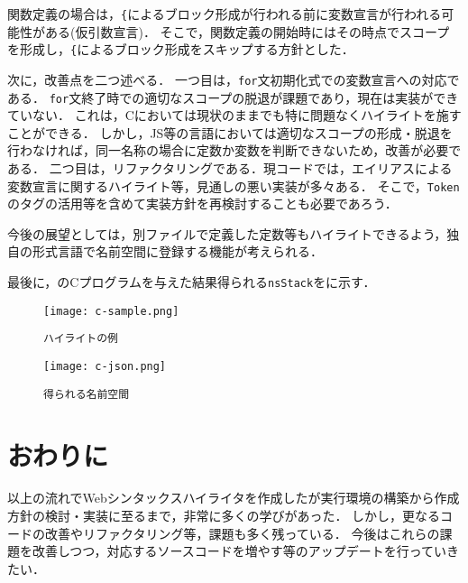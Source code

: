 \documentclass[autodetect-engine,dvi=dvipdfmx,ja=standard,
               a4j,11pt]{bxjsarticle}
\newcommand{\figref}[1]{\makebox{図~\ref{#1}}}
\begin{document}
関数定義の場合は，\verb|{|によるブロック形成が行われる前に変数宣言が行われる可能性がある(仮引数宣言)．
そこで，関数定義の開始時にはその時点でスコープを形成し，\verb|{|によるブロック形成をスキップする方針とした．

次に，改善点を二つ述べる．
一つ目は，\verb|for|文初期化式での変数宣言への対応である．
\verb|for|文終了時での適切なスコープの脱退が課題であり，現在は実装ができていない．
これは，Cにおいては現状のままでも特に問題なくハイライトを施すことができる．
しかし，JS等の言語においては適切なスコープの形成・脱退を行わなければ，同一名称の場合に定数か変数を判断できないため，改善が必要である．
二つ目は，リファクタリングである．現コードでは，エイリアスによる変数宣言に関するハイライト等，見通しの悪い実装が多々ある．
そこで，\verb|Token|のタグの活用等を含めて実装方針を再検討することも必要であろう．

今後の展望としては，別ファイルで定義した定数等もハイライトできるよう，独自の形式言語で名前空間に登録する機能が考えられる．

最後に，\figref{img:c-sample}のCプログラムを与えた結果得られる\verb|nsStack|を\figref{img:c-json}に示す．

\begin{figure}[ht]
\centering
\begin{minipage}[b]{0.49\columnwidth}
  \centering
  \texttt{[image: c-sample.png]}
  \caption{{\tt ハイライトの例}}
  \label{img:c-sample}
\end{minipage}
\begin{minipage}[b]{0.49\columnwidth}
  \centering
  \texttt{[image: c-json.png]}
  \caption{{\tt 得られる名前空間}}
  \label{img:c-json}
\end{minipage}
\end{figure}

\section{おわりに}

以上の流れでWebシンタックスハイライタを作成したが実行環境の構築から作成方針の検討・実装に至るまで，非常に多くの学びがあった．
しかし，更なるコードの改善やリファクタリング等，課題も多く残っている．
今後はこれらの課題を改善しつつ，対応するソースコードを増やす等のアップデートを行っていきたい．
\end{document}
